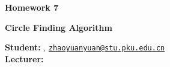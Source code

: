 





\begin{Large}
    \textsf{\textbf{Homework 7}}
    
    \textbf{Circle Finding Algorithm}
\end{Large}

\vspace{1ex}

\textsf{\textbf{Student:}} , \href{mailto:your.email@hotmail.com}{\texttt{zhaoyuanyuan@stu.pku.edu.cn}}\\
\textsf{\textbf{Lecturer:}} 


\vspace{2ex}


